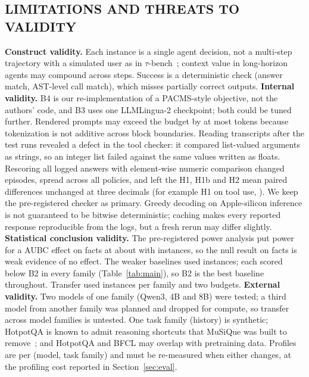 \subsection{LIMITATIONS AND THREATS TO VALIDITY}
\textbf{Construct validity.} Each instance is a single agent decision, not a multi-step trajectory with a simulated
user as in $\tau$-bench~\cite{taubench2024}; context value in long-horizon agents may compound across steps. Success is a deterministic check (answer match, AST-level call match),
which misses partially correct outputs.
\textbf{Internal validity.} B4 is our re-implementation of a PACMS-style objective, not the authors' code, and B3 uses one
LLMLingua-2 checkpoint; both could be tuned further. Rendered prompts may exceed the budget by at most \RMaxOvershoot
tokens because tokenization is not additive across block boundaries. Reading transcripts after the test runs revealed a defect in the tool checker: it compared list-valued arguments as
strings, so an integer list failed against the same values written as floats. Rescoring all logged answers with
element-wise numeric comparison changed \RCheckerFlips episodes, spread across all policies, and left the H1, H1b and H2
mean paired differences unchanged at three decimals (for example H1 on tool use, \RSensHOneTool). We keep the
pre-registered checker as primary. Greedy decoding on Apple-silicon inference is not
guaranteed to be bitwise deterministic; caching makes every reported response reproducible from the logs, but a fresh
rerun may differ slightly.
\textbf{Statistical conclusion validity.} The pre-registered power analysis put power for a \RSesoi{} AUBC effect on facts at
about \RPowerFacts with \RNMain instances, so the null result on facts is weak evidence of no effect. The weaker baselines used
\RNWeak instances; each scored below B2 in every family (Table~\ref{tab:main}), so B2 is the best baseline throughout. Transfer used
\RNTransfer instances per family and two budgets.
\textbf{External validity.} Two models of one family (Qwen3, 4B and 8B) were tested; a third model from another family
was planned and dropped for compute, so transfer across model families is untested. One task family (history) is
synthetic; HotpotQA is known to admit reasoning shortcuts that MuSiQue was built to remove~\cite{musique2022}; and
HotpotQA and BFCL may overlap with pretraining data. Profiles are per (model, task family) and must be
re-measured when either changes, at the profiling cost reported in Section~\ref{sec:eval}.
